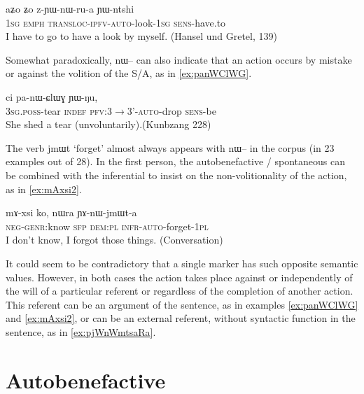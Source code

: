 \documentclass[oldfontcommands,oneside,a4paper,11pt]{article}
\newcommand{\ipa}[1]{{\phon \mbox{#1}}} %
\begin{document}
\begin{exe}
\ex \label{ex:zYWnWrua}
\gll
\ipa{aʑo} 	\ipa{ʑo} 	\ipa{z-ɲɯ-nɯ-ru-a} 	\ipa{ɲɯ-ntshi} \\
\textsc{1sg} \textsc{emph} \textsc{transloc-ipfv-auto}-look-\textsc{1sg} \textsc{sens}-have.to \\
\glt I have to go to have a look by myself. (Hansel und Gretel, 139)
\end{exe} 



Somewhat paradoxically, \ipa{nɯ--} can also indicate that an action occurs by mistake or against the volition of the S/A, as in \ref{ex:panWClWG}.

\begin{exe}
\ex \label{ex:panWClWG}
\gll \ipa{ɯ-qom} 	\ipa{ci} 	\ipa{pa-nɯ-ɕlɯɣ} 	\ipa{ɲɯ-ŋu,} \\
\textsc{3sg.poss}-tear \textsc{indef} \textsc{pfv:3$\rightarrow$3'-auto}-drop \textsc{sens}-be \\
\glt She shed a tear (unvoluntarily).(Kunbzang 228)
\end{exe}

The verb \ipa{jmɯt} `forget' almost always appears with \ipa{nɯ--} in the corpus (in 23 examples out of 28). In the first person, the autobenefactive / spontaneous can be combined with the inferential to insist on the non-volitionality of the action, as in  \ref{ex:mAxsi2}.

\begin{exe}
 \ex \label{ex:mAxsi2}
 \gll
\ipa{mɤ-xsi}  	\ipa{ko,}  	\ipa{nɯra}  	\ipa{ɲɤ-nɯ-jmɯt-a}  \\
\textsc{neg-genr}:know \textsc{sfp} \textsc{dem:pl} \textsc{infr-auto}-forget-\textsc{1pl} \\
\glt I don't know, I forgot those things. (Conversation)
\end{exe}

It could seem to be contradictory that a single marker has such opposite semantic values. However, in both cases the action takes place against or independently of the will of a particular referent or regardless of the completion of another action. This referent can be an argument of the sentence, as in examples \ref{ex:panWClWG} and \ref{ex:mAxsi2}, or can be an external referent, without syntactic function in the sentence, as in \ref{ex:pjWnWmtsaRa}. 


 
\section{Autobenefactive}
\end{document}
